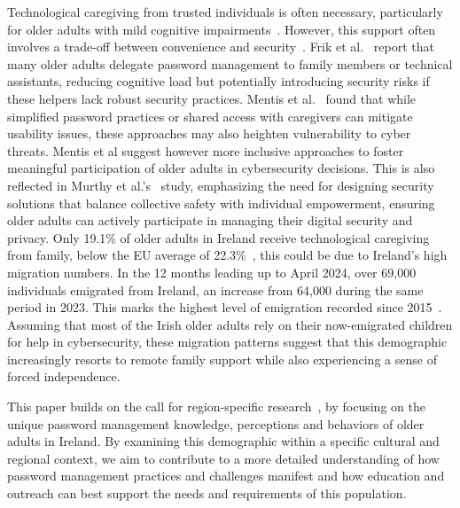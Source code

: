 Technological caregiving from trusted individuals is often necessary, particularly for older adults with mild cognitive impairments~\cite{singh2007password,piper2016technological}. However, this support often involves a trade-off between convenience and security~\cite{latulipe2022unofficial}. Frik et al.~\cite{frik2019privacy} report that many older adults delegate password management to family members or technical assistants, reducing cognitive load but potentially introducing security risks if these helpers lack robust security practices. Mentis et al.~\cite{mentis2020illusion} found that while simplified password practices or shared access with caregivers can mitigate usability issues, these approaches may also heighten vulnerability to cyber threats. Mentis et al suggest however more inclusive approaches to foster meaningful participation of older adults in cybersecurity decisions. This is also reflected in Murthy et al.'s~\cite{murthy2021individually} study, emphasizing the need for designing security solutions that balance collective safety with individual empowerment, ensuring older adults can actively participate in managing their digital security and privacy. %
Only 19.1\% of older adults in Ireland receive technological caregiving from family, below the EU average of 22.3\%~\cite{eurostat2024adulteducation}, this could be due to Ireland's high migration numbers.
In the 12 months leading up to April 2024, over 69,000 individuals emigrated from Ireland, an increase from 64,000 during the same period in 2023. This marks the highest level of emigration recorded since 2015~\cite{Emmigration}. Assuming that most of the Irish older adults rely on their now-emigrated children for help in cybersecurity, these migration patterns suggest that this demographic increasingly resorts to remote family support while also experiencing a sense of forced independence.


This paper builds on the call for region-specific research~\cite{herbert2023world}, by focusing on the unique password management knowledge, perceptions and behaviors of older adults in Ireland. By examining this demographic within a specific cultural and regional context, we aim to contribute to a more detailed understanding of how password management practices and challenges manifest and how education and outreach can best support the needs and requirements of this population. %
